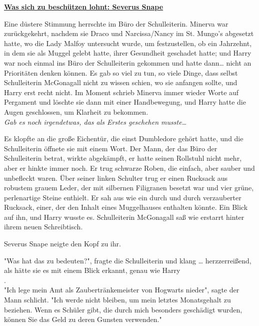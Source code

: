 

\hypertarget{was-sich-zu-beschuxfctzen-lohnt-severus-snape}{%

\textbf{\uline{Was sich zu beschützen lohnt: Severus Snape}}

Eine düstere Stimmung herrschte im Büro der Schulleiterin. Minerva war zurückgekehrt, nachdem sie Draco und Narcissa/Nancy im St. Mungo's abgesetzt hatte, wo die Lady Malfoy untersucht wurde, um festzustellen, ob ein Jahrzehnt, in dem sie als Muggel gelebt hatte, ihrer Gesundheit geschadet hatte; und Harry war noch einmal ins Büro der Schulleiterin gekommen und hatte dann… nicht an Prioritäten denken können. Es gab so viel zu tun, so viele Dinge, dass selbst Schulleiterin McGonagall nicht zu wissen schien, wo sie anfangen sollte, und Harry erst recht nicht. Im Moment schrieb Minerva immer wieder Worte auf Pergament und löschte sie dann mit einer Handbewegung, und Harry hatte die Augen geschlossen, um Klarheit zu bekommen.\\ \emph{\hfill\break Gab es noch irgendetwas, das als Erstes geschehen musste…}

Es klopfte an die große Eichentür, die einst Dumbledore gehört hatte, und die Schulleiterin öffnete sie mit einem Wort. Der Mann, der das Büro der Schulleiterin betrat, wirkte abgekämpft, er hatte seinen Rollstuhl nicht mehr, aber er hinkte immer noch. Er trug schwarze Roben, die einfach, aber sauber und unbefleckt waren. Über seiner linken Schulter trug er einen Rucksack aus robustem grauem Leder, der mit silbernen Filigranen besetzt war und vier grüne, perlenartige Steine enthielt. Er sah aus wie ein durch und durch verzauberter Rucksack, einer, der den Inhalt eines Muggelhauses enthalten könnte. Ein Blick auf ihn, und Harry wusste es. Schulleiterin McGonagall saß wie erstarrt hinter ihrem neuen Schreibtisch.

Severus Snape neigte den Kopf zu ihr.

"Was hat das zu bedeuten?", fragte die Schulleiterin und klang … herzzerreißend, als hätte sie es mit einem Blick erkannt, genau wie Harry\\ .\\ "Ich lege mein Amt als Zaubertränkemeister von Hogwarts nieder", sagte der Mann schlicht. "Ich werde nicht bleiben, um mein letztes Monatsgehalt zu beziehen. Wenn es Schüler gibt, die durch mich besonders geschädigt wurden, können Sie das Geld zu deren Gunsten verwenden."

}
